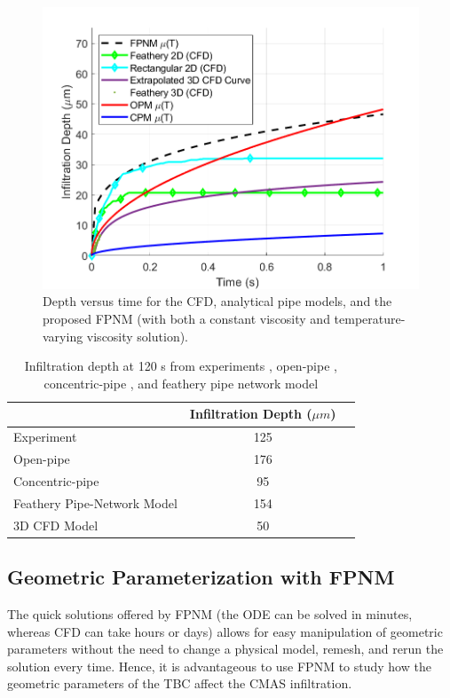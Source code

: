 \documentclass{UCF_ETD}
\begin{document}
\begin{figure}[htp!]
    \centering
    \includegraphics[width=\linewidth]{Figures/analytical.png}
    \caption{Depth versus time for the CFD, analytical pipe models, and the proposed FPNM (with both a constant viscosity and temperature-varying viscosity solution).}
    \label{fig:pipeNetworkResults}
\end{figure}

\begin{table}[htp!]
\caption{\label{tab:resultsCompare} Infiltration depth at 120 s from experiments \cite{Naraparaju2019}, open-pipe \cite{Naraparaju2019}, concentric-pipe \cite{Naraparaju2019}, and feathery pipe network model}
\centering
\begin{tabular}{lcc}
 & Infiltration Depth ($\mu m$)\\
\hline
Experiment & 125\\
Open-pipe & 176\\
Concentric-pipe & 95\\
Feathery Pipe-Network Model & 154\\
3D CFD Model & 50
\end{tabular}
\end{table}

\subsection{Geometric Parameterization with FPNM}

The quick solutions offered by FPNM (the ODE can be solved in minutes, whereas CFD can take hours or days) allows for easy manipulation of geometric parameters without the need to change a physical model, remesh, and rerun the solution every time. Hence, it is advantageous to use FPNM to study how the geometric parameters of the TBC affect the CMAS infiltration.
\end{document}
